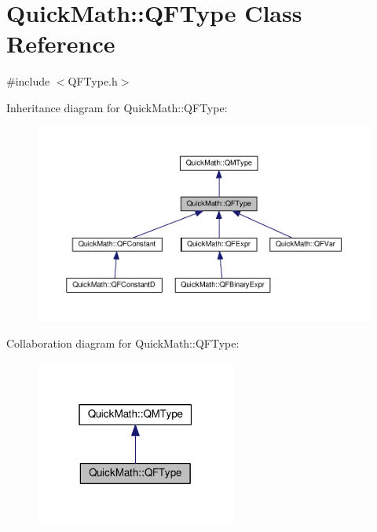 \hypertarget{classQuickMath_1_1QFType}{}\section{Quick\+Math\+:\+:Q\+F\+Type Class Reference}
\label{classQuickMath_1_1QFType}


{\ttfamily \#include $<$Q\+F\+Type.\+h$>$}



Inheritance diagram for Quick\+Math\+:\+:Q\+F\+Type\+:
\nopagebreak
\begin{figure}[H]
\begin{center}
\leavevmode
\includegraphics[width=350pt]{classQuickMath_1_1QFType__inherit__graph}
\end{center}
\end{figure}


Collaboration diagram for Quick\+Math\+:\+:Q\+F\+Type\+:
\nopagebreak
\begin{figure}[H]
\begin{center}
\leavevmode
\includegraphics[width=187pt]{classQuickMath_1_1QFType__coll__graph}
\end{center}
\end{figure}
